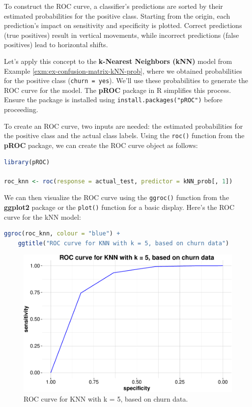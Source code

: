 \documentclass[
]{book}
\newcommand{\passthrough}[1]{#1}
\theoremstyle{definition}
\theoremstyle{definition}
\theoremstyle{definition}
\theoremstyle{definition}
\theoremstyle{remark}
\begin{document}
To construct the ROC curve, a classifier's predictions are sorted by their estimated probabilities for the positive class. Starting from the origin, each prediction's impact on sensitivity and specificity is plotted. Correct predictions (true positives) result in vertical movements, while incorrect predictions (false positives) lead to horizontal shifts.

Let's apply this concept to the \textbf{k-Nearest Neighbors (kNN)} model from Example \ref{exm:ex-confusion-matrix-kNN-prob}, where we obtained probabilities for the positive class (\passthrough{\lstinline!churn = yes!}). We'll use these probabilities to generate the ROC curve for the model. The \textbf{pROC} package in R simplifies this process. Ensure the package is installed using \passthrough{\lstinline!install.packages("pROC")!} before proceeding.

To create an ROC curve, two inputs are needed: the estimated probabilities for the positive class and the actual class labels. Using the \passthrough{\lstinline!roc()!} function from the \textbf{pROC} package, we can create the ROC curve object as follows:

\begin{lstlisting}[language=R]
library(pROC)

roc_knn <- roc(response = actual_test, predictor = kNN_prob[, 1])
\end{lstlisting}

We can then visualize the ROC curve using the \passthrough{\lstinline!ggroc()!} function from the \textbf{ggplot2} package or the \passthrough{\lstinline!plot()!} function for a basic display. Here's the ROC curve for the kNN model:

\begin{lstlisting}[language=R]
ggroc(roc_knn, colour = "blue") +
    ggtitle("ROC curve for KNN with k = 5, based on churn data")
\end{lstlisting}

\begin{figure}

{\centering \includegraphics[width=0.65\linewidth]{evaluation_files/figure-latex/roc-knn-churn-1} 

}

\caption{ROC curve for KNN with k = 5, based on churn data.}\label{fig:roc-knn-churn}
\end{figure}
\end{document}
